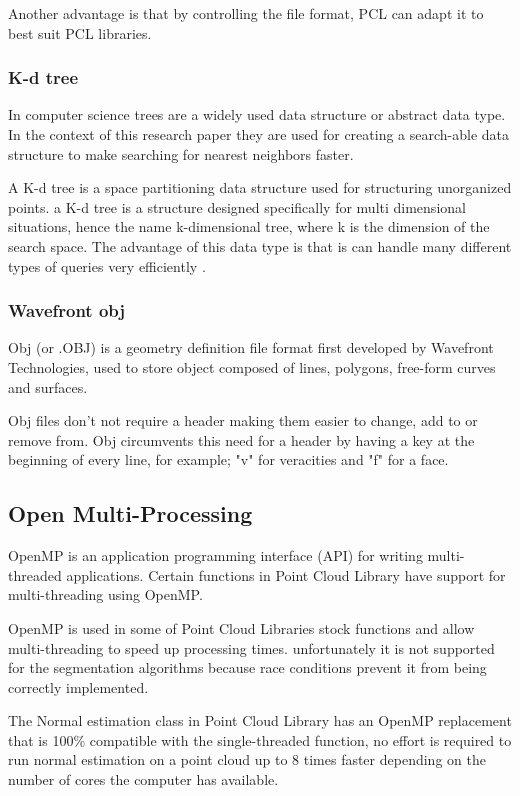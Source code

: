 			Another advantage is that by controlling the file format, PCL can adapt it to best suit PCL libraries. \citep{point_cloud_library_pcd_2010}
		
		\subsubsection{K-d tree}
			In computer science trees are a widely used data structure or abstract data type. In the context of this research paper they are used for creating a search-able data structure to make searching for nearest neighbors faster.
			
			A K-d tree is a space partitioning data structure used for structuring unorganized points. a K-d tree is a structure designed specifically for multi dimensional situations, hence the name k-dimensional tree, where k is the dimension of the search space. The advantage of this data type is that is can handle many different types of queries very efficiently \citep{bentley_multidimensional_1975}.
		
		
		\subsubsection{Wavefront obj}
			Obj (or .OBJ) is a geometry definition file format first developed by Wavefront Technologies, used to store object composed of lines, polygons, free-form curves and surfaces.
			
			 Obj files don't not require a header making them easier to change, add to or remove from. Obj circumvents this need for a header by having a key at the beginning of every line, for example; "v" for veracities and "f" for a face.
			 
			 
		
	
	\subsection{Open Multi-Processing}
	OpenMP is an application programming interface (API) for writing multi-threaded applications. Certain functions in Point Cloud Library have support for multi-threading using OpenMP.
	
	OpenMP is used in some of Point Cloud Libraries stock functions and allow multi-threading to speed up processing times. unfortunately it is not supported for the segmentation algorithms because race conditions prevent it from being correctly implemented. 
	
	The Normal estimation class in Point Cloud Library has an OpenMP replacement that is 100\% compatible with the single-threaded function, no effort is required to run normal estimation on a point cloud up to 8 times faster depending on the number of cores the computer has available.
	

	

	
